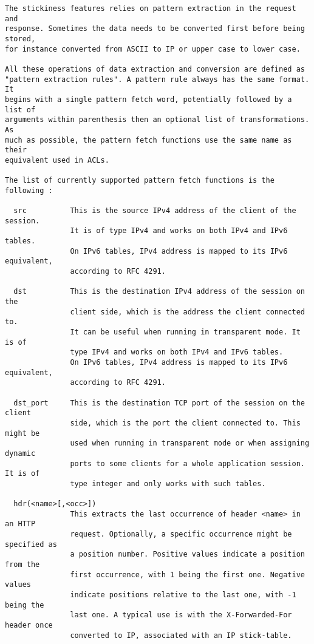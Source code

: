 \begin{verbatim}
The stickiness features relies on pattern extraction in the request and
response. Sometimes the data needs to be converted first before being stored,
for instance converted from ASCII to IP or upper case to lower case.

All these operations of data extraction and conversion are defined as
"pattern extraction rules". A pattern rule always has the same format. It
begins with a single pattern fetch word, potentially followed by a list of
arguments within parenthesis then an optional list of transformations. As
much as possible, the pattern fetch functions use the same name as their
equivalent used in ACLs.

The list of currently supported pattern fetch functions is the following :

  src          This is the source IPv4 address of the client of the session.
               It is of type IPv4 and works on both IPv4 and IPv6 tables.
               On IPv6 tables, IPv4 address is mapped to its IPv6 equivalent,
               according to RFC 4291.

  dst          This is the destination IPv4 address of the session on the
               client side, which is the address the client connected to.
               It can be useful when running in transparent mode. It is of
               type IPv4 and works on both IPv4 and IPv6 tables.
               On IPv6 tables, IPv4 address is mapped to its IPv6 equivalent,
               according to RFC 4291.

  dst_port     This is the destination TCP port of the session on the client
               side, which is the port the client connected to. This might be
               used when running in transparent mode or when assigning dynamic
               ports to some clients for a whole application session. It is of
               type integer and only works with such tables.

  hdr(<name>[,<occ>])
               This extracts the last occurrence of header <name> in an HTTP
               request. Optionally, a specific occurrence might be specified as
               a position number. Positive values indicate a position from the
               first occurrence, with 1 being the first one. Negative values
               indicate positions relative to the last one, with -1 being the
               last one. A typical use is with the X-Forwarded-For header once
               converted to IP, associated with an IP stick-table.


\end{verbatim}
